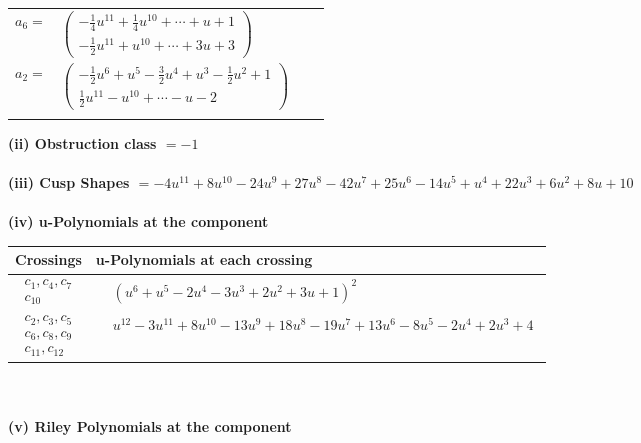 \documentclass[1p]{elsarticle_modified}
\theoremstyle{definition}
\begin{document}
\begin{tabular}{m{7pt} m{180pt} m{7pt} m{180pt} }
\flushright $a_{6}=$&$\begin{pmatrix}-\frac{1}{4} u^{11}+\frac{1}{4} u^{10}+\cdots+u+1\\-\frac{1}{2} u^{11}+u^{10}+\cdots+3 u+3\end{pmatrix}$ \\
\flushright $a_{2}=$&$\begin{pmatrix}-\frac{1}{2} u^6+u^5-\frac{3}{2} u^4+u^3-\frac{1}{2} u^2+1\\\frac{1}{2} u^{11}- u^{10}+\cdots- u-2\end{pmatrix}$\\&\end{tabular}
\flushleft \textbf{(ii) Obstruction class $= -1$}\\~\\
\flushleft \textbf{(iii) Cusp Shapes $= -4 u^{11}+8 u^{10}-24 u^9+27 u^8-42 u^7+25 u^6-14 u^5+u^4+22 u^3+6 u^2+8 u+10$}\\~\\
\newpage\renewcommand{\arraystretch}{1}
\flushleft \textbf{(iv) u-Polynomials at the component}\newline \\
\begin{tabular}{m{50pt}|m{274pt}}
Crossings & \hspace{64pt}u-Polynomials at each crossing \\
\hline $$\begin{aligned}c_{1},c_{4},c_{7}\\c_{10}\end{aligned}$$&$\begin{aligned}
&(u^6+u^5-2 u^4-3 u^3+2 u^2+3 u+1)^2
\end{aligned}$\\
\hline $$\begin{aligned}c_{2},c_{3},c_{5}\\c_{6},c_{8},c_{9}\\c_{11},c_{12}\end{aligned}$$&$\begin{aligned}
&u^{12}-3 u^{11}+8 u^{10}-13 u^9+18 u^8-19 u^7+13 u^6-8 u^5-2 u^4+2 u^3+4
\end{aligned}$\\
\hline
\end{tabular}\\~\\
\newpage\renewcommand{\arraystretch}{1}
\flushleft \textbf{(v) Riley Polynomials at the component}\newline \\
\end{document}
